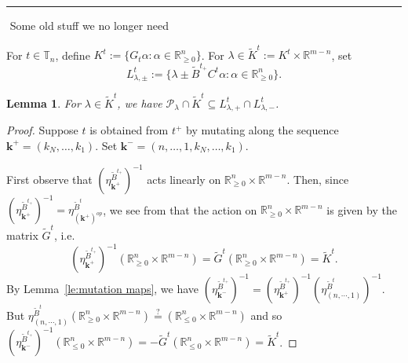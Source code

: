 \documentclass{amsart}
\newtheorem{lemma}[theorem]{Lemma}
\numberwithin{theorem}{section}
\newcommand{\bfk}{{\boldsymbol{k}}}
\newcommand{\cP}{\mathcal{P}}
\newcommand{\RR}{\mathbb{R}}
\newcommand{\TT}{\mathbb{T}}
\begin{document}
\hrule

$ $
Some old stuff we no longer need

  For $t\in\TT_n$, define $K^t:=\{G_t\alpha:\alpha\in\RR_{\ge0}^n\}$.
  For $\lambda \in \widetilde K^t := K^t \times \RR^{m-n}$, set 
  \[L^t_{\lambda,\pm}:=\{\lambda \pm \widetilde B^{t_+} C^t\alpha:\alpha\in\RR_{\ge0}^n\}.\]
  \begin{lemma}
    For $\lambda\in \widetilde K^t$, we have $\cP_\lambda\cap \widetilde K^t\subseteq L^t_{\lambda,+}\cap L^t_{\lambda,-}$.
  \end{lemma}
  \begin{proof}
    Suppose $t$ is obtained from $t^+$ by mutating along the sequence $\bfk^+=(k_N,\ldots,k_1)$.
    Set $\bfk^-=(n,\ldots,1,k_N,\ldots,k_1)$.

    First observe that $\left(\eta^{\widetilde B^{t_+}}_{\bfk^+}\right)^{-1}$ acts linearly on $\RR_{\ge0}^n\times \RR^{m-n}$.
    Then, since $\left(\eta^{\widetilde B^{t_+}}_{\bfk^+}\right)^{-1}=\eta^{\widetilde B^t}_{(\bfk^+)^{op}}$, we see from \cite[Equation (1.13)]{nakanishi-zelevinsky} that the action on $\RR_{\ge0}^n\times \RR^{m-n}$ is given by the matrix $\widetilde G^t$, i.e. 
    \[\left(\eta^{\widetilde B^{t_+}}_{\bfk^+}\right)^{-1}(\RR_{\ge0}^n\times \RR^{m-n})=\widetilde G^t(\RR_{\ge0}^n\times \RR^{m-n})=\widetilde K^t.\]
    By Lemma~\ref{le:mutation maps}, we have $\left(\eta^{\widetilde B^{t_+}}_{\bfk^-}\right)^{-1}=\left(\eta^{\widetilde B^{t_+}}_{\bfk^+}\right)^{-1}\left(\eta^{\widetilde B^t}_{(n,\cdots,1)}\right)^{-1}$.
    But $\eta^{\widetilde B^t}_{(n,\cdots,1)}(\RR_{\ge0}^n\times \RR^{m-n})\stackrel{?}{=}(\RR_{\le0}^n\times \RR^{m-n})$ and so $\left(\eta^{\widetilde B^{t_+}}_{\bfk^-}\right)^{-1}(\RR_{\le0}^n\times \RR^{m-n})=-\widetilde G^t(\RR_{\le0}^n\times \RR^{m-n})=\widetilde K^t$.


\end{proof}
\end{document}
